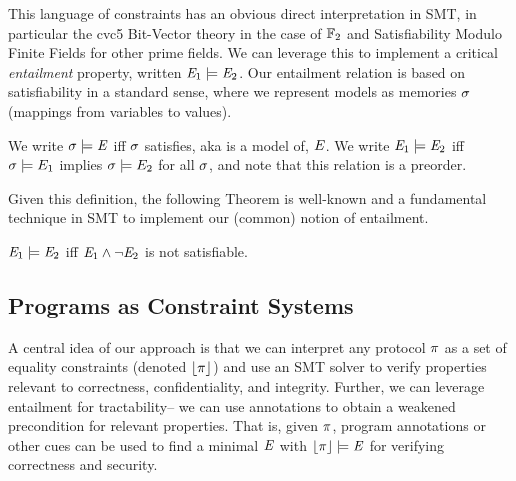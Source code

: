 %
%  
%  

This language of constraints has an obvious direct interpretation in
SMT, in particular the cvc5 Bit-Vector theory in the case of $\mathbb{F}_{2}$ and
Satisfiability Modulo Finite Fields \cite{SMFF} for other prime fields. We can
leverage this to implement a critical \emph{entailment} property,
written $\mathit{E}_1 \models \mathit{E}_2$.  Our entailment relation is based on
satisfiability in a standard sense, where we represent models as
memories $\sigma$ (mappings from variables to values).
\begin{definition}
  We write $\sigma \models \mathit{E}$ iff $\sigma$ satisfies, aka is a model
  of, $\mathit{E}$. We write $\mathit{E}_1 \models
  \mathit{E}_2$ iff  $\sigma \models E_1$ implies $\sigma \models
  E_2$ for all $\sigma$, and note that this relation is a preorder.
\end{definition}
Given this definition, the following Theorem is well-known and a fundamental
technique in SMT to implement our (common) notion of entailment. 
\begin{theorem}
  $\mathit{E}_1 \models \mathit{E}_2$ iff $\mathit{E}_1 \wedge \neg\mathit{E}_2$ is
  not satisfiable.
\end{theorem}

\subsection{Programs as Constraint Systems}
\label{section-smt-toeq}

\toeqfig

A central idea of our approach is that we can interpret any protocol
$\pi$ as a set of equality constraints (denoted $\lfloor \pi \rfloor$) and use an SMT
solver to verify properties relevant to correctness, confidentiality,
and integrity. Further, we can leverage entailment for tractability--
we can use annotations to obtain a weakened precondition for relevant properties.
That is, given $\pi$, program annotations or other cues can be used
to find a minimal $\mathit{E}$ with $\lfloor \pi \rfloor \models \mathit{E}$ for verifying
correctness and security.

